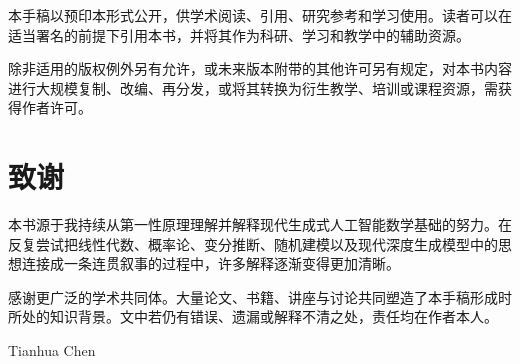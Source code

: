 本手稿以预印本形式公开，供学术阅读、引用、研究参考和学习使用。读者可以在适当署名的前提下引用本书，并将其作为科研、学习和教学中的辅助资源。

除非适用的版权例外另有允许，或未来版本附带的其他许可另有规定，对本书内容进行大规模复制、改编、再分发，或将其转换为衍生教学、培训或课程资源，需获得作者许可。

\section*{致谢}
%

本书源于我持续从第一性原理理解并解释现代生成式人工智能数学基础的努力。在反复尝试把线性代数、概率论、变分推断、随机建模以及现代深度生成模型中的思想连接成一条连贯叙事的过程中，许多解释逐渐变得更加清晰。

感谢更广泛的学术共同体。大量论文、书籍、讲座与讨论共同塑造了本手稿形成时所处的知识背景。文中若仍有错误、遗漏或解释不清之处，责任均在作者本人。

\vspace{1cm}

\begin{flushright}
Tianhua Chen\\
\textit{\bookdate}
\end{flushright}
